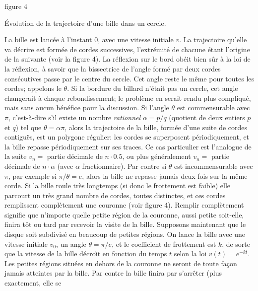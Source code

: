 \midinsert 
\centerline{} 
\vskip 3mm 
\centerline{\eightpoint figure 4} 
\vskip 6pt 
\centerline{\eightpoint \'Evolution de la trajectoire d'une bille dans un 
cercle.}  
\vskip3mm
\endinsert 
 
La bille est lanc\'ee \`a l'instant 0, avec une vitesse initiale $v$. La 
trajectoire qu'elle va d\'ecrire est form\'ee de cordes successives, 
l'extr\'emit\'e de chacune \'etant l'origine de la suivante (voir la figure 
4).  La r\'eflexion sur le bord ob\'eit bien s\^ur \`a la loi de la r\'eflexion,  
\`a savoir que  la bissectrice de l'angle form\'e par deux cordes 
cons\'ecutives passe par le centre du cercle. Cet angle reste le m\^eme 
pour toutes les cordes; appelons le $\theta$. Si la bordure du billard  
n'\'etait pas un cercle, cet angle changerait \`a chaque rebondissement; 
le probl\`eme en serait rendu plus compliqu\'e, mais sans aucun 
b\'en\'efice pour la discussion.  
\medskip 
Si l'angle $\theta$ est commensurable avec $\pi$, c'est-\`a-dire s'il 
existe un nombre {\it rationnel} $\alpha = p/q$ (quotient de deux 
entiers $p$ et $q$) tel que $\theta = \alpha\pi$, alors la trajectoire  
de la bille, form\'ee d'une suite de cordes contigu\"es,  est un polygone 
r\'egulier: les cordes se superposent p\'eriodiquement, et la bille  
repasse p\'eriodiquement sur ses traces. Ce cas particulier est 
l'analogue de la suite $v_n = $ partie d\'ecimale de $n \cdot 0.5$, ou  
plus g\'en\'eralement $v_n = $ partie d\'ecimale de $n \cdot \alpha$  
(avec $\alpha$ fractionnaire). Par contre si $\theta$ est 
incommensurable avec $\pi$, par exemple si $\pi / \theta = e$, alors  
la bille ne repasse  jamais deux fois sur la m\^eme corde. Si la bille 
roule tr\`es longtemps (si donc le frottement est faible) elle parcourt  
un tr\`es grand nombre de cordes, toutes distinctes, et ces cordes 
remplissent compl\`etement une couronne (voir figure 4). Remplir 
compl\`etement signifie que n'importe quelle petite r\'egion de la 
couronne, aussi petite soit-elle, finira t\^ot ou tard par recevoir la 
visite de la bille.   
\medskip 
Supposons maintenant que le disque soit subdivis\'e en beaucoup de 
petites r\'egions. On lance la bille avec une vitesse initiale $v_0$, un 
angle  $\theta = \pi / e$, et le coefficient de frottement est $k$, de 
sorte que la vitesse de la bille d\'ecro{\^\i}t en fonction du temps $t$
selon la loi $v(t) = e^{-kt}$.  Les petites r\'egions situ\'ees en dehors
de la couronne ne seront de toute fa\c con jamais atteintes par la bille. 
Par contre la bille finira par s'arr\^eter (plus exactement, elle se 
